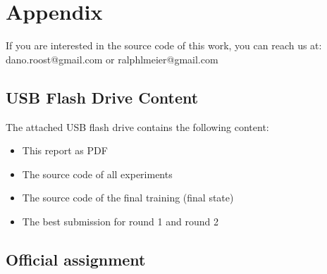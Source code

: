%
%



\chapter{Appendix}\label{chap.anhang}

If you are interested in the source code of this work, you can reach us at:\\dano.roost@gmail.com or ralphlmeier@gmail.com

\section{USB Flash Drive Content}

The attached USB flash drive contains the following content:
\begin{itemize}
    \item This report as PDF
    \item The source code of all experiments
    \item The source code of the final training (final state)
    \item The best submission for round 1 and round 2
\end{itemize}

\section{Official assignment}



\NewPage